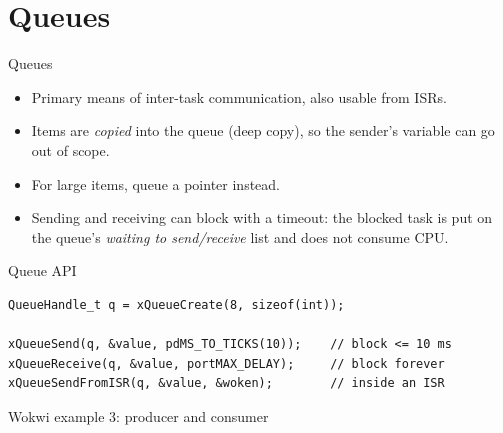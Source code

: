 \section{Queues}

\begin{frame}{Queues}
  \begin{itemize}
    \item Primary means of inter-task communication, also usable from ISRs.
    \item Items are \emph{copied} into the queue (deep copy), so the sender's variable can go out of scope.
    \item For large items, queue a pointer instead.
    \item Sending and receiving can block with a timeout: the blocked task is put on the queue's \emph{waiting to send/receive} list and does not consume CPU.
  \end{itemize}
\end{frame}

\begin{frame}[fragile]{Queue API}
\begin{lstlisting}
QueueHandle_t q = xQueueCreate(8, sizeof(int));

xQueueSend(q, &value, pdMS_TO_TICKS(10));    // block <= 10 ms
xQueueReceive(q, &value, portMAX_DELAY);     // block forever
xQueueSendFromISR(q, &value, &woken);        // inside an ISR
\end{lstlisting}
\end{frame}

\begin{frame}[fragile]{Wokwi example 3: producer and consumer}
\end{frame}

